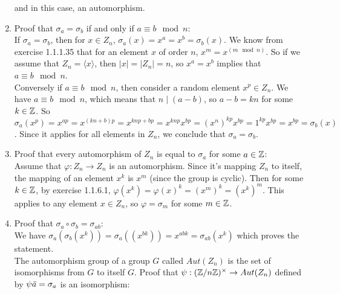 \documentclass[12pt]{article}
\begin{document}
\begin{enumerate}[label=\textbf{\alph*.}]
            and in this case, an automorphism.
        \item
            Proof that $\sigma_a = \sigma_b$
            if and only if $a \equiv b \mod n$: \\
            If $\sigma_a = \sigma_b$,
            then for $x \in Z_n$,
            $\sigma_a(x) = x^a = x^b = \sigma_b(x)$.
            We know from exercise 1.1.1.35 that for an element $x$ of
            order $n$, $x^m = x^{(m \mod n)}$.
            So if we assume that $Z_n = \langle x \rangle$,
            then $|x| = |Z_n| = n$,
            so $x^a = x^b$
            implies that $a \equiv b \mod n$. \\
            Conversely if $a \equiv b \mod n$,            
            then consider a random element $x^p \in Z_n$.
            We have $a \equiv b \mod n$,
            which means that $n \mid (a - b)$,
            so $a - b = kn$ for some $k \in \mathbb{Z}$.
            So $\sigma_a(x^p) = x^{ap}
            = x^{(kn + b)p}
            = x^{knp + bp}
            = x^{knp}x^{bp}
            = (x^n)^{kp}x^{bp}
            = 1^{kp}x^{bp}
            = x^{bp}
            = \sigma_b(x)$.
            Since it applies for all elements in $Z_n$,
            we conclude that $\sigma_a = \sigma_b$.
        \item
            Proof that every automorphism of $Z_n$ is equal
            to $\sigma_a$ for some $a \in \mathbb{Z}$: \\
            Assume that $\varphi:Z_n \to Z_n$ is an automorphism.
            Since it's mapping $Z_n$ to itself,
            the mapping of an element $x^k$ is $x^m$
            (since the group is cyclic).
            Then for some $k \in \mathbb{Z}$,
            by exercise 1.1.6.1,
            $\varphi(x^k) = \varphi(x)^k = (x^m)^k = (x^k)^m$.
            This applies to any element $x \in Z_n$,
            so $\varphi = \sigma_m$ for some $m \in \mathbb{Z}$. 
        \item
            Proof that $\sigma_a \circ \sigma_b = \sigma_{ab}$: \\
            We have $\sigma_a(\sigma_b(x^k))
            = \sigma_a((x^{bk}))
            = x^{abk}
            = \sigma_{ab}(x^k)$
            which proves the statement. \\
            The automorphism group of a group $G$ called $Aut(Z_n)$
            is the set of isomorphisms from $G$ to itself $G$.
            Proof that $\psi: (\mathbb{Z}/n\mathbb{Z})^\times \to Aut(Z_n)$
            defined by $\psi{\,\overline{\!{a}}} = \sigma_a$ is an isomorphism: \\

\end{enumerate}
\end{document}
